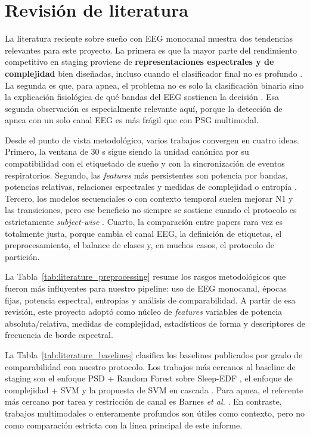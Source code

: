 \section{Revisi\'on de literatura}

La literatura reciente sobre sue\~no con EEG monocanal muestra dos tendencias relevantes para este proyecto. La primera es que la mayor parte del rendimiento competitivo en staging proviene de \textbf{representaciones espectrales y de complejidad} bien dise\~nadas, incluso cuando el clasificador final no es profundo \cite{gao2023psdrf,nakamura2017complexity,ghimatgar2019hmm,li2022cascadedsvm}. La segunda es que, para apnea, el problema no es solo la clasificaci\'on binaria sino la explicaci\'on fisiol\'ogica de qu\'e bandas del EEG sostienen la decisi\'on \cite{barnes2022apneaeegcnn}. Esa segunda observaci\'on es especialmente relevante aqu\'i, porque la detecci\'on de apnea con un solo canal EEG es m\'as fr\'agil que con PSG multimodal.

Desde el punto de vista metodol\'ogico, varios trabajos convergen en cuatro ideas. Primero, la ventana de 30 s sigue siendo la unidad can\'onica por su compatibilidad con el etiquetado de sue\~no y con la sincronizaci\'on de eventos respiratorios. Segundo, las \emph{features} m\'as persistentes son potencia por bandas, potencias relativas, relaciones espectrales y medidas de complejidad o entrop\'ia \cite{gao2023psdrf,nakamura2017complexity}. Tercero, los modelos secuenciales o con contexto temporal suelen mejorar N1 y las transiciones, pero ese beneficio no siempre se sostiene cuando el protocolo es estrictamente \emph{subject-wise} \cite{mousavi2019sleepeegnet,ghimatgar2019hmm}. Cuarto, la comparaci\'on entre papers rara vez es totalmente justa, porque cambia el canal EEG, la definici\'on de etiquetas, el preprocesamiento, el balance de clases y, en muchos casos, el protocolo de partici\'on.



La Tabla~\ref{tab:literature_preprocessing} resume los rasgos metodol\'ogicos que fueron m\'as influyentes para nuestro pipeline: uso de EEG monocanal, \'epocas fijas, potencia espectral, entrop\'ias y an\'alisis de comparabilidad. A partir de esa revisi\'on, este proyecto adopt\'o como n\'ucleo de \emph{features} variables de potencia absoluta/relativa, medidas de complejidad, estad\'isticos de forma y descriptores de frecuencia de borde espectral.



La Tabla~\ref{tab:literature_baselines} clasifica los baselines publicados por grado de comparabilidad con nuestro protocolo. Los trabajos m\'as cercanos al baseline de staging son el enfoque PSD + Random Forest sobre Sleep-EDF \cite{gao2023psdrf}, el enfoque de complejidad + SVM \cite{nakamura2017complexity} y la propuesta de SVM en cascada \cite{li2022cascadedsvm}. Para apnea, el referente m\'as cercano por tarea y restricci\'on de canal es Barnes \emph{et al.} \cite{barnes2022apneaeegcnn}. En contraste, trabajos multimodales o enteramente profundos son \'utiles como contexto, pero no como comparaci\'on estricta con la l\'inea principal de este informe.
